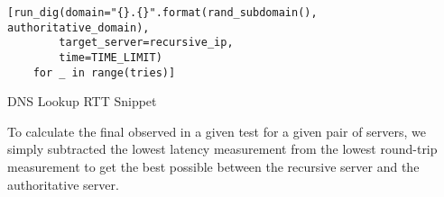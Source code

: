 \begin{code}[h]
\centering
    \begin{verbatim}
[run_dig(domain="{}.{}".format(rand_subdomain(), authoritative_domain),
        target_server=recursive_ip, 
        time=TIME_LIMIT) 
    for _ in range(tries)]
    \end{verbatim}
    \caption{DNS Lookup RTT Snippet}
    \label{fig:dns_lookup_rtt_snippet}
\end{code}

To calculate the final \rtt observed in a given test for a given pair of servers, we simply subtracted the lowest latency measurement from the lowest round-trip measurement to get the best possible \rtt between the recursive \dns server and the authoritative \dns server.